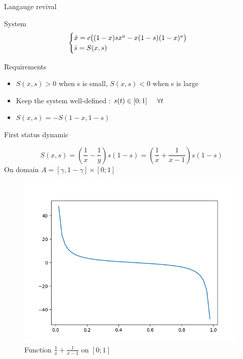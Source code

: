 \documentclass[10pt]{beamer}
\begin{document}
\begin{frame}{Langauge revival}

\begin{exampleblock}{System}
\begin{equation}
\label{eq:1dtemp}
\begin{cases}
\dot{x} = c\big( (1-x)sx^a - x(1-s)(1-x)^a \big) \\
\dot{s} = S(x, s) \\
\end{cases}
\end{equation}
\end{exampleblock}

\begin{alertblock}{Requirements}
\begin{itemize}
\item $S(x,s) > 0$ when s is small, $S(x,s) < 0$ when s is large
\item Keep the system well-defined : $s(t) \in [0;1] \hspace{0.5cm} \forall{t}$
\item $S(x,s) = - S(1-x, 1-s)$
\end{itemize}
\end{alertblock}

\end{frame}

\begin{frame}{First status dynamic}

\begin{equation}
\label{eq:sdyn1}
S(x,s) = (\frac{1}{x}-\frac{1}{y})s(1-s) = (\frac{1}{x}+\frac{1}{x-1})s(1-s)
\end{equation}
On domain $A = [\gamma, 1-\gamma] \times [0;1]$

\begin{figure}[H]
\centering
\includegraphics[scale=0.3]{functionofs.png}
\caption{Function $\frac{1}{x}+\frac{1}{x-1}$ on $[0;1]$}
\end{figure}

\end{frame}
\end{document}
